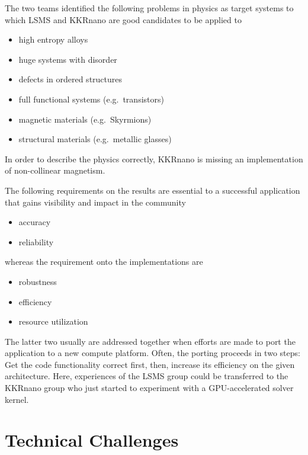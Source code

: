 \documentclass{llncs}
\def\KKRnano{{KKRnano}}
\def\LSMS{{LSMS}}
\begin{document}
The two teams identified the following problems in physics as target systems to which \LSMS{} and \KKRnano{}
are good candidates to be applied to
\begin{itemize}
 \item high entropy alloys
 \item huge systems with disorder
 \item defects in ordered structures
 \item full functional systems (e.g.~transistors)
 \item magnetic materials (e.g.~Skyrmions)
 \item structural materials (e.g.~metallic glasses)
\end{itemize}

In order to describe the physics correctly, \KKRnano{} is missing an implementation of non-collinear magnetism.


The following requirements on the results are essential to a successful application that gains visibility and impact in the community
\begin{itemize}
 \item accuracy
 \item reliability
\end{itemize}
whereas the requirement onto the implementations are
\begin{itemize}
 \item robustness
 \item efficiency
 \item resource utilization 
\end{itemize}
The latter two usually are addressed together when efforts are made to port the application to a new compute platform.
Often, the porting proceeds in two steps: Get the code functionality correct first, then, increase its efficiency on
the given architecture. Here, experiences of the \LSMS{} group could be transferred to the \KKRnano{} group who just
started to experiment with a GPU-accelerated solver kernel.

\section{Technical Challenges} \label{section:tech}
\end{document}

